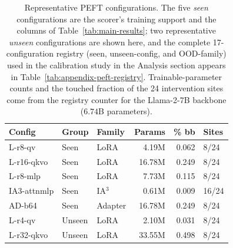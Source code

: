 \begin{table}[t]
\centering
\small
\setlength{\tabcolsep}{3pt}
\caption{Representative PEFT configurations. The five \emph{seen} configurations
are the scorer's training support and the columns of
Table~\ref{tab:main-results}; two representative \emph{unseen} configurations are
shown here, and the complete 17-configuration registry (seen, unseen-config, and
OOD-family) used in the calibration study in the Analysis section appears in
Table~\ref{tab:appendix-peft-registry}. Trainable-parameter counts and the
touched fraction of the 24 intervention sites come from the registry counter for
the Llama-2-7B backbone ($6.74$B parameters).}
\label{tab:peft-configs}
\begin{tabular}{lllrrl}
\toprule
Config & Group & Family & Params & \% bb & Sites \\
\midrule
L-r8-qv     & Seen & LoRA    & 4.19M  & 0.062 & 8/24  \\
L-r16-qkvo  & Seen & LoRA    & 16.78M & 0.249 & 8/24  \\
L-r8-mlp    & Seen & LoRA    & 7.73M  & 0.115 & 8/24  \\
IA3-attnmlp & Seen & IA$^3$  & 0.61M  & 0.009 & 16/24 \\
AD-b64      & Seen & Adapter & 16.78M & 0.249 & 8/24  \\
\midrule
L-r4-qv     & Unseen & LoRA  & 2.10M  & 0.031 & 8/24  \\
L-r32-qkvo  & Unseen & LoRA  & 33.55M & 0.498 & 8/24  \\
\bottomrule
\end{tabular}
\end{table}
